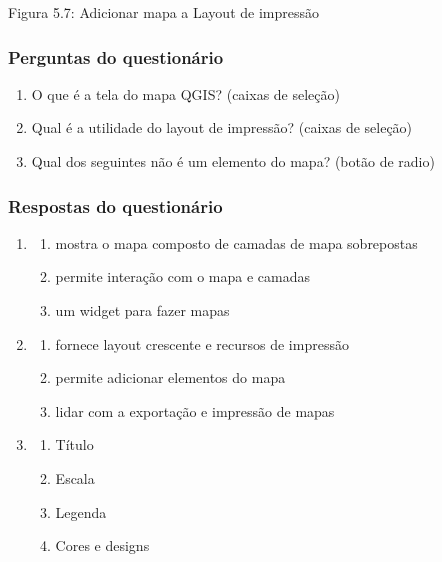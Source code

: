\documentclass[
]{book}
\providecommand{\tightlist}{%
  \setlength{\itemsep}{0pt}\setlength{\parskip}{0pt}}
\begin{document}
Figura 5.7: Adicionar mapa a Layout de impressão

\hypertarget{perguntas-do-questionuxe1rio-11}{%
\subsubsection{\texorpdfstring{\textbf{Perguntas do questionário }}{Perguntas do questionário }}\label{perguntas-do-questionuxe1rio-11}}

\begin{enumerate}
\def\labelenumi{\arabic{enumi}.}
\tightlist
\item
  O que é a tela do mapa QGIS? (caixas de seleção)
\item
  Qual é a utilidade do layout de impressão? (caixas de seleção)
\item
  Qual dos seguintes não é um elemento do mapa? (botão de radio)
\end{enumerate}

\hypertarget{respostas-do-questionuxe1rio-2}{%
\subsubsection{\texorpdfstring{\textbf{Respostas do questionário }}{Respostas do questionário }}\label{respostas-do-questionuxe1rio-2}}

\begin{enumerate}
\def\labelenumi{\arabic{enumi}.}
\item
  \begin{enumerate}
  \def\labelenumii{\alph{enumii}.}
  \tightlist
  \item
    mostra o mapa composto de camadas de mapa sobrepostas
  \item
    permite interação com o mapa e camadas
  \item
    um widget para fazer mapas
  \end{enumerate}
\item
  \begin{enumerate}
  \def\labelenumii{\alph{enumii}.}
  \tightlist
  \item
    fornece layout crescente e recursos de impressão
  \item
    permite adicionar elementos do mapa
  \item
    lidar com a exportação e impressão de mapas
  \end{enumerate}
\item
  \begin{enumerate}
  \def\labelenumii{\alph{enumii}.}
  \tightlist
  \item
    Título
  \item
    Escala
  \item
    Legenda
  \item
    Cores e designs
  \end{enumerate}
\end{enumerate}
\end{document}
